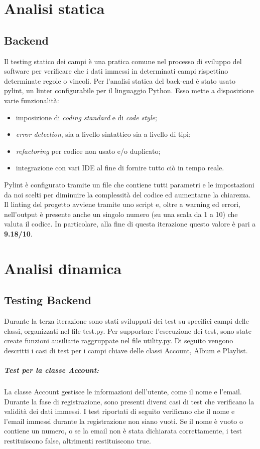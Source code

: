 \newpage
\section{Analisi statica}
\vspace{2pt}
\subsection{Backend}
Il testing statico dei campi è una pratica comune nel processo di sviluppo del software 
per verificare che i dati immessi in determinati campi rispettino determinate regole o vincoli. 
Per l'analisi statica del back-end è stato usato pylint, un linter configurabile per il 
linguaggio Python. Esso mette a disposizione varie funzionalità:
\begin{itemize}
    \item imposizione di \textit{coding standard} e di \textit{code style};
    \item \textit{error detection}, sia a livello sintattico sia a livello di tipi;
    \item \textit{refactoring} per codice non usato e/o duplicato;
    \item integrazione con vari IDE al fine di fornire tutto ciò in tempo reale. 
\end{itemize}
Pylint è configurato tramite un file che contiene tutti parametri e le impostazioni 
da noi scelti per diminuire la complessità del codice ed aumentarne la chiarezza.
Il linting del progetto avviene tramite uno script e, oltre a warning ed errori, 
nell'output è presente anche un singolo numero (su una scala da 1 a 10) che valuta il codice. 
In particolare, alla fine di questa iterazione questo valore è pari a \textbf{9.18/10}.


\newpage
\section{Analisi dinamica}
\subsection{Testing Backend}
Durante la terza iterazione sono stati sviluppati dei test su specifici campi delle classi, organizzati nel file test.py. Per supportare l'esecuzione 
dei test, sono state create funzioni ausiliarie raggruppate nel file utility.py.
Di seguito vengono descritti i casi di test per i campi chiave delle classi Account, Album e Playlist.

\vspace{3pt}
\subparagraph{Test per la classe \textbf{Account:}} La classe Account gestisce le informazioni dell'utente, come il nome e l'email. 
Durante la fase di registrazione, sono presenti diversi casi di test che verificano la validità dei dati immessi.
I test riportati di seguito verificano che il nome e l'email immessi durante la registrazione non siano vuoti. 
Se il nome è vuoto o contiene un numero, o se la email non è stata dichiarata correttamente, i test restituiscono false, altrimenti restituiscono true.

